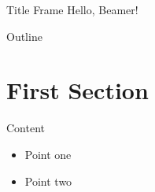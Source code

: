 \documentclass{beamer}
\begin{document}
\begin{frame}{Title Frame}
  Hello, Beamer!
\end{frame}

\begin{frame}{Outline}
  \tableofcontents
\end{frame}

\section{First Section}

\begin{frame}{Content}
  \begin{itemize}
    \item Point one
    \item Point two
  \end{itemize}
\end{frame}
\end{document}
